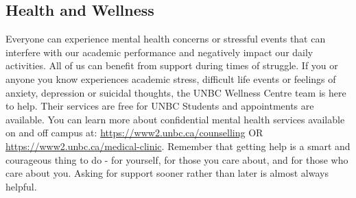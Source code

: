 \documentclass[letterpaper,12pt]{article}
\theoremstyle{dotlessS}
\begin{document}
\subsection*{Health and Wellness}
Everyone can experience mental health concerns or stressful events that can interfere with our academic performance and negatively impact our daily activities.
All of us can benefit from support during times of struggle.  If you or anyone you know experiences academic stress, difficult life events or feelings of anxiety, depression or suicidal thoughts, the UNBC Wellness Centre team is here to help. Their services are free for UNBC Students and appointments are available. You can learn more about confidential mental health services available on and off campus at:  
 \url{https://www2.unbc.ca/counselling}  OR \url{https://www2.unbc.ca/medical-clinic}. Remember that getting help is a smart and courageous thing to do - for yourself, for those you care about, and for those who care about you. Asking for support sooner rather than later is almost always helpful. 
\end{document}
